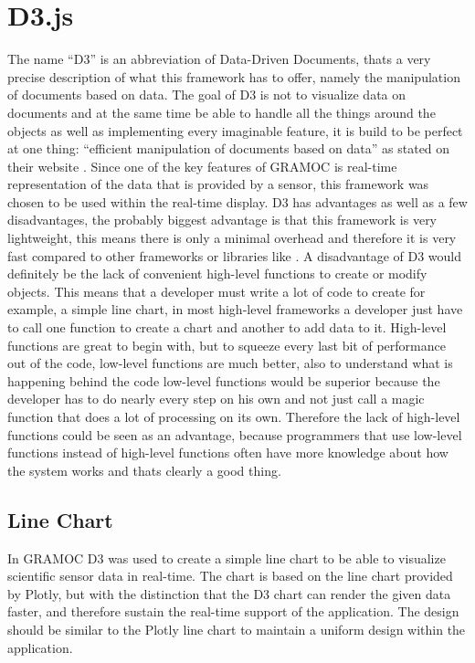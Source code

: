 \section{D3.js}
The name ``D3'' is an abbreviation of Data-Driven Documents, thats a very precise description of what this framework has to offer, namely the manipulation of documents based on data. The goal of D3 is not to visualize data on documents and at the same time be able to handle all the things around the objects as well as implementing every imaginable feature, it is build to be perfect at one thing: ``efficient manipulation of documents based on data'' as stated on their website \cite{d3}. Since one of the key features of GRAMOC is real-time representation of the data that is provided by a sensor, this framework was chosen to be used within the real-time display. D3 has advantages as well as a few disadvantages, the probably biggest advantage is that this framework is very lightweight, this means there is only a minimal overhead and therefore it is very fast compared to other frameworks or libraries like . A disadvantage of D3 would definitely be the lack of convenient high-level functions to create or modify objects. This means that a developer must write a lot of code to create for example, a simple line chart, in most high-level frameworks a developer just have to call one function to create a chart and another to add data to it. High-level functions are great to begin with, but to squeeze every last bit of performance out of the code, low-level functions are much better, also to understand what is happening behind the code low-level functions would be superior because the developer has to do nearly every step on his own and not just call a magic function that does a lot of processing on its own. Therefore the lack of high-level functions could be seen as an advantage, because programmers that use low-level functions instead of high-level functions often have more knowledge about how the system works and thats clearly a good thing.

\subsection{Line Chart}
In GRAMOC D3 was used to create a simple line chart to be able to visualize scientific sensor data in real-time. The chart is based on the line chart provided by Plotly, but with the distinction that the D3 chart can render the given data faster, and therefore sustain the real-time support of the application. The design should be similar to the Plotly line chart to maintain a uniform design within the application.

